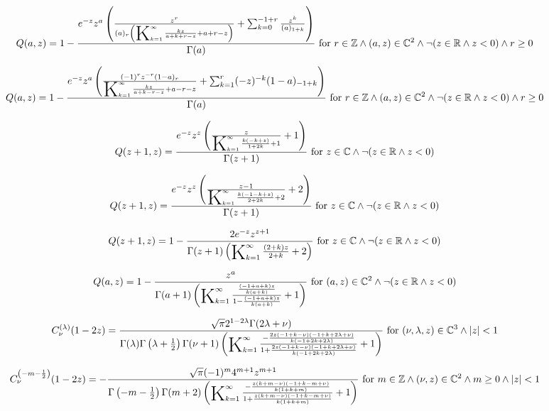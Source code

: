 \documentclass{article}
\newcommand{\bigK}{\mathop{\raisebox{-5pt}{\huge K}}}
\begin{document}
\[Q(a,z)=1-\frac{e^{-z} z^a \left(\frac{z^r}{(a)_r \left(\bigK_{k=1}^{\infty}\frac{k z}{a+k+r-z}+a+r-z\right)}+\sum _{k=0}^{-1+r} \frac{z^k}{(a)_{1+k}}\right)}{\Gamma (a)}\text{ for }r\in \mathbb{Z}\land (a,z)\in \mathbb{C}^2\land \neg (z\in \mathbb{R}\land z<0)\land r\geq 0\] 

\[Q(a,z)=1-\frac{e^{-z} z^a \left(\frac{(-1)^r z^{-r} (1-a)_r}{\bigK_{k=1}^{\infty}\frac{k z}{a+k-r-z}+a-r-z}+\sum _{k=1}^r (-z)^{-k} (1-a)_{-1+k}\right)}{\Gamma (a)}\text{ for }r\in \mathbb{Z}\land (a,z)\in \mathbb{C}^2\land \neg (z\in \mathbb{R}\land z<0)\land r\geq 0\] 

\[Q(z+1,z)=\frac{e^{-z} z^z \left(\frac{z}{\bigK_{k=1}^{\infty}\frac{k (-k+z)}{1+2 k}+1}+1\right)}{\Gamma (z+1)}\text{ for }z\in \mathbb{C}\land \neg (z\in \mathbb{R}\land z<0)\] 

\[Q(z+1,z)=\frac{e^{-z} z^z \left(\frac{z-1}{\bigK_{k=1}^{\infty}\frac{k (-1-k+z)}{2+2 k}+2}+2\right)}{\Gamma (z+1)}\text{ for }z\in \mathbb{C}\land \neg (z\in \mathbb{R}\land z<0)\] 

\[Q(z+1,z)=1-\frac{2 e^{-z} z^{z+1}}{\Gamma (z+1) \left(\bigK_{k=1}^{\infty}\frac{(2+k) z}{2+k}+2\right)}\text{ for }z\in \mathbb{C}\land \neg (z\in \mathbb{R}\land z<0)\] 

\[Q(a,z)=1-\frac{z^a}{\Gamma (a+1) \left(\bigK_{k=1}^{\infty}\frac{\frac{(-1+a+k) z}{k (a+k)}}{1-\frac{(-1+a+k) z}{k (a+k)}}+1\right)}\text{ for }(a,z)\in \mathbb{C}^2\land \neg (z\in \mathbb{R}\land z<0)\] 

\[C_{\nu }^{(\lambda )}(1-2 z)=\frac{\sqrt{\pi } 2^{1-2 \lambda } \Gamma (2 \lambda +\nu )}{\Gamma (\lambda ) \Gamma \left(\lambda +\frac{1}{2}\right) \Gamma (\nu +1) \left(\bigK_{k=1}^{\infty}\frac{-\frac{2 z (-1+k-\nu ) (-1+k+2 \lambda +\nu )}{k (-1+2 k+2 \lambda )}}{1+\frac{2 z (-1+k-\nu ) (-1+k+2 \lambda +\nu )}{k (-1+2 k+2 \lambda )}}+1\right)}\text{ for }(\nu ,\lambda ,z)\in \mathbb{C}^3\land \left| z\right| <1\] 

\[C_{\nu }^{\left(-m-\frac{1}{2}\right)}(1-2 z)=-\frac{\sqrt{\pi } (-1)^m 4^{m+1} z^{m+1}}{\Gamma \left(-m-\frac{1}{2}\right) \Gamma (m+2) \left(\bigK_{k=1}^{\infty}\frac{-\frac{z (k+m-\nu ) (-1+k-m+\nu )}{k (1+k+m)}}{1+\frac{z (k+m-\nu ) (-1+k-m+\nu )}{k (1+k+m)}}+1\right)}\text{ for }m\in \mathbb{Z}\land (\nu ,z)\in \mathbb{C}^2\land m\geq 0\land \left| z\right| <1\] 
\end{document}
